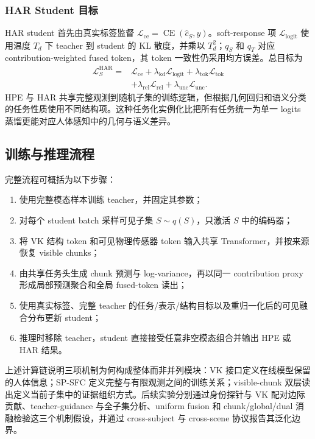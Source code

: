 \documentclass[journal]{IEEEtran}
\begin{document}
\subsubsection{HAR Student 目标}

HAR student 首先由真实标签监督 $\mathcal L_{\mathrm{ce}}=\operatorname{CE}(\hat c_S,y)$。soft-response 项 $\mathcal L_{\mathrm{logit}}$ 使用温度 $T_d$ 下 teacher 到 student 的 KL 散度，并乘以 $T_d^2$；$q_S$ 和 $q_T$ 对应 contribution-weighted fused token，其 token 一致性仍采用均方误差。总目标为
\begin{equation}
\begin{aligned}
\mathcal L^{\mathrm{HAR}}_S
=&\mathcal L_{\mathrm{ce}}
+\lambda_{\mathrm{kd}}\mathcal L_{\mathrm{logit}}
+\lambda_{\mathrm{tok}}\mathcal L_{\mathrm{tok}}\\
&+\lambda_{\mathrm{rel}}\mathcal L_{\mathrm{rel}}
+\lambda_{\mathrm{unc}}\mathcal L_{\mathrm{unc}}.
\end{aligned}
\label{eq:har_student_loss}
\end{equation}
HPE 与 HAR 共享完整观测到随机子集的训练逻辑，但根据几何回归和语义分类的任务性质使用不同结构项。这种任务化实例化比把所有任务统一为单一 logits 蒸馏更能对应人体感知中的几何与语义差异。

\subsection{训练与推理流程}

完整流程可概括为以下步骤：
\begin{enumerate}
    \item 使用完整模态样本训练 teacher，并固定其参数；
    \item 对每个 student batch 采样可见子集 $S\sim q(S)$，只激活 $S$ 中的编码器；
    \item 将 VK 结构 token 和可见物理传感器 token 输入共享 Transformer，并按来源恢复 visible chunks；
    \item 由共享任务头生成 chunk 预测与 log-variance，再以同一 contribution proxy 形成局部预测聚合和全局 fused-token 读出；
    \item 使用真实标签、完整 teacher 的任务/表示/结构目标以及重归一化后的可见融合分布更新 student；
    \item 推理时移除 teacher，student 直接接受任意非空模态组合并输出 HPE 或 HAR 结果。
\end{enumerate}

上述计算链说明三项机制为何构成整体而非并列模块：VK 接口定义在线模型保留的人体信息；SP-SFC 定义完整与有限观测之间的训练关系；visible-chunk 双层读出定义当前子集中的证据组织方式。后续实验分别通过身份探针与 VK 配对边际贡献、teacher-guidance 与全子集分析、uniform fusion 和 chunk/global/dual 消融检验这三个机制假设，并通过 cross-subject 与 cross-scene 协议报告其泛化边界。
\end{document}
